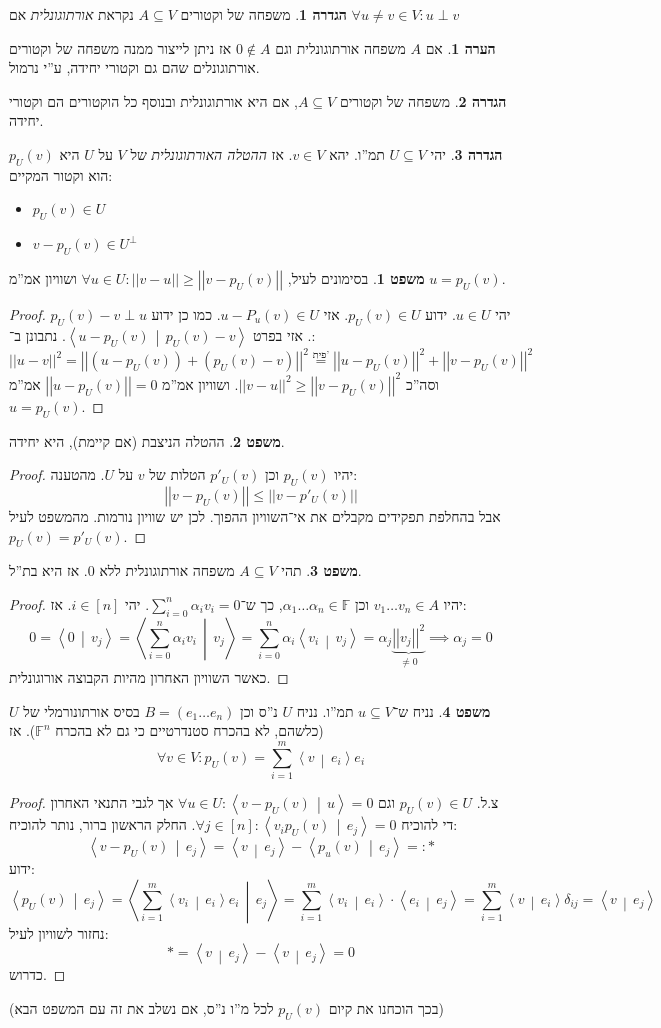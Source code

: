 \documentclass[a4paper]{article}
\newcommand\ra    {\rangle}
\newcommand\la    {\langle}
\newcommand\sumni     {\sum_{i = 0}^{n}}
\newcommand\F         {\mathbb{F}}
\newcommand\co        {\colon}
\newcommand\norm[1]   {\left \vert \left \vert #1 \right \vert \right \vert}
\newcommand\mut [2]   {\left \la #1 \,\middle\vert\, #2 \right \ra}
\newcommand\ag        {\alpha}
\theoremstyle{definition}
\newtheorem{Theorem}{משפט}
\newtheorem{definition}{הגדרה}
\newtheorem{Remark}{הערה}
\newcommand\theo  [1] {\begin{Theorem}#1\end{Theorem}}
\newcommand\defi  [1] {\begin{definition}#1\end{definition}}
\newcommand\rmark [1] {\begin{Remark}#1\end{Remark}}
\begin{document}
	\defi{משפחה של וקטורים $A \subseteq V$ נקראת \textit{אורתוגונלית} אם $\forall u \neq v \in V\co u \perp v$}
	\rmark{אם $A$ משפחה אורתוגונלית וגם $0 \notin A$ אז ניתן לייצור ממנה משפחה של וקטורים אורתוגונלים שהם גם וקטורי יחידה, ע''י נרמול. \\}
	
	\defi{משפחה של וקטורים $A \subseteq V$, אם היא אורתוגונלית ובנוסף כל הוקטורים הם וקטורי יחידה. }
	
	\defi{יהי $U \subseteq V$ תמ''ו. יהא $v \in V$. אז \textit{ההטלה האורתוגונלית} של $V$ על $U$ היא $p_U(v)$ הוא וקטור המקיים: 
		\begin{itemize}
			\item \hfil $p_U(v) \in U$ 
			\item \hfil $v - p_U(v) \in U^\perp$
	\end{itemize}}
	\theo{בסימונים לעיל, $\forall u \in U \co \norm{v - u} \ge \norm{v - p_U(v)}$ ושוויון אמ''מ $u = p_U(v)$. }
	
	\begin{proof}
		יהי $u \in U$. ידוע $p_U(v) \in U$. אזי $u - P_u(v) \in U$. כמו כן ידוע $p_U(v) - v \perp u$. אזי בפרט $\mut{u - p_U(v)}{p_U(v) - v}$. נתבונן ב־: 
		\[ \norm{u - v}^2 = \norm{(u - p_U(v)) + (p_U(v) - v)}^2 \overset{\text{פית'}}{=} \norm{u - p_U(v)}^2 + \norm{v - p_U(v)}^2 \]
		וסה''כ $\norm{v - u}^2 \ge \norm{v - p_U(v)}^2$. ושוויון אמ''מ $\norm{u- p_U(v)} = 0$ אמ''מ $u  = p_U(v)$. 
	\end{proof}
	\theo{ההטלה הניצבת (אם קיימת), היא יחידה. }\begin{proof}
		יהיו $p_U(v)$ וכן $p'_U(v)$ הטלות של $v$ על $U$. מהטענה: 
		\[ \norm{v - p_U(v)} \le \norm{v - p'_U(v)} \]
		אבל בהחלפת תפקידים מקבלים את אי־השוויון ההפוך. לכן יש שוויון נורמות. מהמשפט לעיל $p_U(v) = p'_U(v)$. 
	\end{proof}
	
	\theo{תהי $A \subseteq V$ משפחה אורתוגונלית ללא $0$. אז היא בת''ל. }\begin{proof}
		יהיו $v_1 \dots v_n \in A$ וכן $\ag_1 \dots \ag_n \in \F$, כך ש־$\sumni \ag_i v_i = 0$. יהי $i \in [n]$. אז: 
		\[ 0 = \mut{0}{v_j} = \mut{\sumni \ag_i v_i}{v_j} = \sumni \ag_i \mut{v_i}{v_j} = \ag _j \underbrace{\norm{v_j}^2}_{\neq 0} \implies \ag_j = 0 \]
		כאשר השוויון האחרון מהיות הקבוצה אורוגונלית. 
	\end{proof}
	\theo{נניח ש־$u \subseteq V$ תמ''ו. נניח $U$ נ''ס וכן $B = (e_1 \dots e_n)$ בסיס אורתונורמלי של $U$ (כלשהם, לא בהכרח סטנדרטיים כי גם לא בהכרח $\F^n$). אז 
		\[ \forall v \in V \co p_U(v) = \sum_{i = 1}^{m}\mut{v}{e_i}e_i \]}
	\begin{proof}
		צ.ל. $p_U(v) \in U$ וגם $\forall u \in U \co \mut{v - p_U(v)}{u} = 0$ אך לגבי התנאי האחרון די להוכיח $\forall j \in [n] \co \mut{v_i p_U(v)}{e_j}  = 0$. החלק הראשון ברור, נותר להוכיח: 
		\[ \mut{v - p_U(v)}{e_j} = \mut{v}{e_j} - \mut{p_u(v)}{e_j} =: * \]
		ידוע: 
		\[ \mut{p_U(v)}{e_j} = \mut{\sum_{i = 1}^{m}\mut{v_i}{e_i} e_i}{e_j} = \sum_{i = 1}^{m}\mut{v_i}{e_i} \cdot \mut{e_i}{e_j} = \sum_{i = 1}^{m}\mut{v}{e_i}\delta_{ij} = \mut{v}{e_j} \]
		נחזור לשוויון לעיל: 
		\[ *= \mut{v}{e_j} - \mut{v}{e_j} = 0 \]
		כדרוש. 
	\end{proof}
	(בכך הוכחנו את קיום $p_U(v)$ לכל מ''ו נ''ס, אם נשלב את זה עם המשפט הבא)
	
\end{document}
